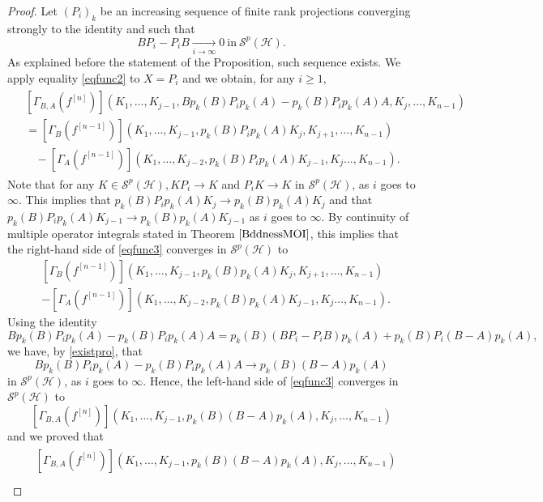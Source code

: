 \documentclass[12pt]{amsart}
\theoremstyle{remark}
\begin{document}
\begin{proof}
Let $(P_i)_k$ be an increasing sequence of finite rank projections converging strongly to the identity and such that
\begin{equation}\label{existpro}
BP_i - P_iB \underset{i \to \infty}{\longrightarrow} 0 \ \text{in} \ \mathcal{S}^p(\mathcal{H}).
\end{equation}
As explained before the statement of the Proposition, such sequence exists. We apply equality \eqref{eqfunc2} to $X=P_i$ and we obtain, for any $i\geq 1$,
\begin{align}\label{eqfunc3}
\begin{split}
& \left[ \Gamma_{B,A}(f^{[n]})\right](K_1, \ldots, K_{j-1}, Bp_k(B)P_ip_k(A) - p_k(B)P_ip_k(A)A, K_j, \ldots, K_{n-1}) \\
& = \left[ \Gamma_B(f^{[n-1]})\right](K_1, \ldots, K_{j-1}, p_k(B)P_ip_k(A) K_j, K_{j+1}, \ldots, K_{n-1})\\
& \ \ \ \ - \left[ \Gamma_A(f^{[n-1]})\right](K_1, \ldots, K_{j-2}, p_k(B)P_ip_k(A)K_{j-1}, K_j \ldots, K_{n-1}).
\end{split}
\end{align}
Note that for any $K \in \mathcal{S}^p(\mathcal{H}), KP_i \to K$ and $P_iK\to K$ in $\mathcal{S}^p(\mathcal{H})$, as $i$ goes to $\infty$. This implies that $p_k(B)P_ip_k(A) K_j \to p_k(B)p_k(A) K_j$ and that $p_k(B)P_ip_k(A)K_{j-1} \to p_k(B)p_k(A)K_{j-1}$ as $i$ goes to $\infty$. By continuity of multiple operator integrals stated in Theorem $\ref{BddnessMOI}$, this implies that the right-hand side of \eqref{eqfunc3} converges in $\mathcal{S}^p(\mathcal{H})$ to
\begin{align*}
&\left[ \Gamma_B (f^{[n-1]})\right](K_1, \ldots, K_{j-1}, p_k(B)p_k(A) K_j, K_{j+1}, \ldots, K_{n-1})\\
& - \left[ \Gamma_A (f^{[n-1]})\right](K_1, \ldots, K_{j-2}, p_k(B)p_k(A)K_{j-1}, K_j \ldots, K_{n-1}).
\end{align*}
Using the identity
$$
Bp_k(B)P_ip_k(A) - p_k(B)P_ip_k(A)A = p_k(B)(BP_i-P_iB)p_k(A) + p_k(B)P_i(B-A)p_k(A),
$$
we have, by \eqref{existpro}, that
$$
Bp_k(B)P_ip_k(A) - p_k(B)P_ip_k(A)A \to p_k(B)(B-A)p_k(A)
$$
in $\mathcal{S}^p(\mathcal{H})$, as $i$ goes to $\infty$. Hence, the left-hand side of \eqref{eqfunc3} converges in $\mathcal{S}^p(\mathcal{H})$ to
$$
\left[ \Gamma_{B,A}(f^{[n]})\right](K_1, \ldots, K_{j-1}, p_k(B)(B-A)p_k(A), K_j, \ldots, K_{n-1})
$$
and we proved that
\begin{align}\label{eqfunc4}
\begin{split}
& \left[ \Gamma_{B,A}(f^{[n]})\right](K_1, \ldots, K_{j-1}, p_k(B)(B-A)p_k(A), K_j, \ldots, K_{n-1}) \\

\end{split}
\end{align}
\end{proof}
\end{document}
